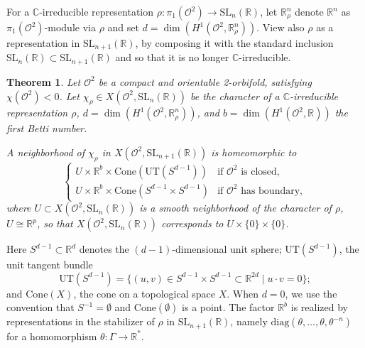 \documentclass[a4paper,11pt]{article}
\newtheorem{Theorem}{Theorem}[section]
\newtheorem{Remark}[Theorem]{Remark}
\begin{document}
For a  
 $\mathbb C$-irreducible 
representation $\rho\colon\pi_1(\mathcal O^2)\to \mathrm{SL}_{n}(\mathbb R)$, let $ \mathbb R^n_\rho$ denote 
$ \mathbb R^n$ as 
 $\pi_1(\mathcal O^2)$-module via $\rho$ and  
  set  $d=\dim(H^1(\mathcal O^2,\mathbb R^n_\rho))$.
View also $\rho$ as a representation in  $ \mathrm{SL}_{n+1}(\mathbb R)$, by composing it with the standard inclusion 
$ \mathrm{SL}_{n}(\mathbb R)\subset \mathrm{SL}_{n+1}(\mathbb R)$ and so that it is no longer 
$\mathbb C$-irreducible.
 
 

\begin{Theorem}
 \label{Theorem:orientable}
Let $\mathcal O^2$ be a compact and orientable 2-orbifold, satisfying $\chi(\mathcal O^2)<0$. 
Let  $\chi_\rho\in X( \mathcal O^2, \mathrm{SL}_{n}(\mathbb R) )$  
be the character of a $\mathbb C$-irreducible representation  $ \rho$,
$d=  \dim(H^1(\mathcal O^2,\mathbb R^n_\rho))$, and $b= \dim(H^1(\mathcal O^2,\mathbb R))$ the 
first Betti number. 

A neighborhood of  $\chi_\rho$ in  
 $ X(\mathcal O^2, \mathrm{SL}_{n+1}(\mathbb R))$ is
 homeomorphic to 
 $$
 \begin{cases}
        U\times \mathbb R^b\times  \mathrm{Cone}( \mathrm{UT}( S^{d-1})) & \textrm{if }\mathcal O^2 \textrm{ is closed},\\
         U\times \mathbb R^b\times 
         \mathrm{Cone}( S^{d-1}\times S^{d-1}) & \textrm{if }\mathcal O^2 \textrm{ has boundary},
        \end{cases}
 $$
 where $U\subset X(\mathcal O^2, \mathrm{SL}_{n}(\mathbb R) ) $ is a smooth neighborhood 
 of the character of $\rho$, $U\cong \mathbb R^p$,
 so that $X(\mathcal O^2, \mathrm{SL}_{n}(\mathbb R) ) $
 corresponds to $U\times\{0\}\times\{0\}$.
\end{Theorem}

 Here $S^{d-1}\subset \mathbb R^d$ denotes the $(d-1)$-dimensional unit sphere; 
 $ \mathrm{UT} (S^{d-1})$, the unit tangent bundle
 $$
 \mathrm{UT} (S^{d-1})=\{(u, v)\in S^{d-1}\times S^{d-1}\subset \mathbb R^{2d}\mid u\cdot v=0 \};
 $$  
 and
$\mathrm{Cone}(X)$, the cone on a topological space $X$.
When $d=0$, we use the convention that 
$S^{-1}=\emptyset$ and 
$ \mathrm{Cone}( \emptyset)$ is a point.
%  
 The factor $\mathbb R^b$ is realized by representations in the stabilizer of $\rho$ 
 in $\mathrm{SL}_{n+1}(\mathbb R) $, namely
 $\mathrm{diag}( \theta,\ldots,\theta, \theta^{-n})$ for a homomorphism $\theta\colon\Gamma\to \mathbb R^*$. 
 
\end{document}
